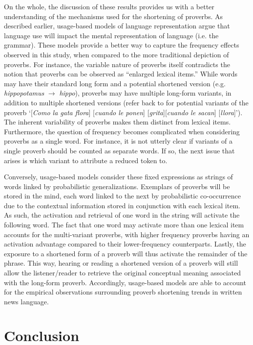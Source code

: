 \documentclass[output=paper,colorlinks,citecolor=brown,draftmode]{langscibook}
\begin{document}
On the whole, the discussion of these results provides us with a better understanding of the mechanisms used for the shortening of proverbs. As described earlier, usage-based models of language representation argue that language use will impact the mental representation of language (i.e. the grammar). These models provide a better way to capture the frequency effects observed in this study, when compared to the more traditional depiction of proverbs. For instance, the variable nature of proverbs itself contradicts the notion that proverbs can be observed as ``enlarged lexical items.'' While words may have their standard long form and a potential shortened version (e.g. \textit{hippopotamus} $\rightarrow$ \textit{hippo}), proverbs may have multiple long-form variants, in addition to multiple shortened versions (refer back to  for potential variants of the proverb `[\emph{Como la gata flora}] [\emph{cuando le ponen}] [\emph{grita}][\emph{cuando le sacan}] [\emph{llora}]'). The inherent variability of proverbs makes them distinct from lexical items. Furthermore, the question of frequency becomes complicated when considering proverbs as a single word. For instance, it is not utterly clear if variants of a single proverb should be counted as separate words. If so, the next issue that arises is which variant to attribute a reduced token to.

Conversely, usage-based models consider these fixed expressions as strings of words linked by probabilistic generalizations. Exemplars of proverbs will be stored in the mind, each word linked to the next by probabilistic co-occurrence due to the contextual information stored in conjunction with each lexical item. As such, the activation and retrieval of one word in the string will activate the following word. The fact that one word may activate more than one lexical item accounts for the multi-variant proverbs, with higher frequency proverbs having an activation advantage compared to their lower-frequency counterparts. Lastly, the exposure to a shortened form of a proverb will thus activate the remainder of the phrase. This way, hearing or reading a shortened version of a proverb will still allow the listener/reader to retrieve the original conceptual meaning associated with the long-form proverb. Accordingly, usage-based models are able to account for the empirical observations surrounding proverb shortening trends in written news language.

\section{Conclusion}\label{sec:conclusion}
\end{document}
